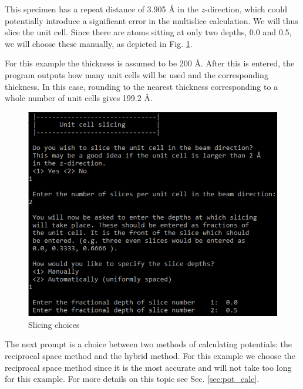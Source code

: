 \documentclass[12pt,a4paper]{article}
\begin{document}
This specimen has a repeat distance of 3.905 \AA{} in the $z$-direction, which could potentially introduce a significant error in the multislice calculation.
We will thus slice the unit cell.
Since there are atoms sitting at only two depths, 0.0 and 0.5, we will choose these manually, as depicted in Fig. \ref{fig:pw_abs_slicing}.

For this example the thickness is assumed to be 200 \AA{}.
After this is entered, the program outputs how many unit cells will be used and the corresponding thickness.
In this case, rounding to the nearest thickness corresponding to a whole number of unit cells gives 199.2 \AA{}.
    
\begin{figure}[!h]
\begin{center}
    \includegraphics[scale=0.75]{pw_abs_slicing.png}
\caption{Slicing choices}
\label{fig:pw_abs_slicing}
\end{center}
\end{figure}

The next prompt is a choice between two methods of calculating potentials: the reciprocal space method and the hybrid method.
For this example we choose the reciprocal space method since it is the most accurate and will not take too long for this example.
For more details on this topic see Sec. \ref{sec:pot_calc}.
\end{document}

